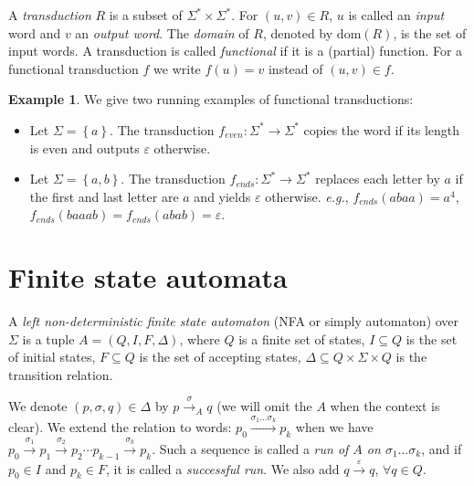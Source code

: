\documentclass[12pt]{report}
\theoremstyle{definition}
\newtheorem{xmp}{Example}[section]
\theoremstyle{remark}
\begin{document}
A \emph{transduction} $R$ is a subset of $\Sigma^\ast\times\Sigma^\ast$.
For $(u,v)\in R$, $u$ is called an \emph{input} word and $v$ an \emph{output word}.
The \emph{domain} of $R$, denoted by $\mathrm{dom}(R)$, is the set of input words.
A transduction is called \emph{functional} if it is a (partial) function.
For a functional transduction $f$ we write $f(u)=v$ instead of $(u,v)\in f$.
\begin{xmp}
We give two running examples of functional transductions:

\begin{itemize}

\item Let $\Sigma=\left\{a\right\}$.
The transduction $f_{even}:\Sigma^\ast\rightarrow \Sigma^\ast$ copies the word if its length is even and outputs $\varepsilon$ otherwise.

\item Let $\Sigma=\left\{a,b\right\}$.
The transduction $f_{ends}:\Sigma^\ast\rightarrow \Sigma^\ast$ replaces each letter by $a$ if the first and last letter are $a$ and yields $\varepsilon$ otherwise. \emph{e.g.}, $f_{ends}(abaa)=a^4$, $f_{ends}(baaab)=f_{ends}(abab)=\varepsilon$.

\end{itemize}

\end{xmp}


\section{Finite state automata}

A \emph{left non-deterministic finite state automaton} (NFA or simply automaton) over $\Sigma$ is a tuple $A=\left(Q,I,F,\Delta \right)$,
where $Q$ is a finite set of states,
$I\subseteq Q$ is the set of initial states,
$F\subseteq Q$ is the set of accepting states,
$\Delta\subseteq Q\times\Sigma\times Q$ is the transition relation.

We denote $(p,\sigma,q)\in \Delta$ by $p\xrightarrow{\sigma}_A q$ (we will omit the $A$ when the context is clear).
We extend the relation to words: $p_0\xrightarrow{\sigma_1\ldots\sigma_k} p_k$ when we have $p_0\xrightarrow{\sigma_1} p_1\xrightarrow{\sigma_2} p_2\cdots p_{k-1}\xrightarrow{\sigma_k} p_k$. Such a sequence is called a \emph{run of $A$ on $\sigma_1\ldots\sigma_k$}, and if $p_0\in I$ and $p_k\in F$, it is called a \emph{successful run}. We also add $q\xrightarrow \varepsilon q$, $\forall q\in Q$.
\end{document}
